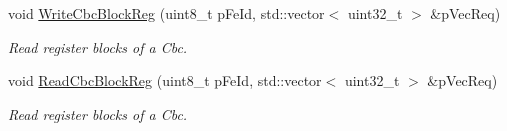 \begin{CompactItemize}
void \hyperlink{class_ph2___hw_interface_1_1_glib_f_w_interface_2bc165eebeab754425dcbffb21aa2717}{Write\-Cbc\-Block\-Reg} (uint8\_\-t p\-Fe\-Id, std::vector$<$ uint32\_\-t $>$ \&p\-Vec\-Req)
\begin{CompactList}\small\item\em Read register blocks of a Cbc. \item\end{CompactList}\item 
void \hyperlink{class_ph2___hw_interface_1_1_glib_f_w_interface_9dbc3cf2a991126aed53d834d4d152ce}{Read\-Cbc\-Block\-Reg} (uint8\_\-t p\-Fe\-Id, std::vector$<$ uint32\_\-t $>$ \&p\-Vec\-Req)
\begin{CompactList}\small\item\em Read register blocks of a Cbc. \item\end{CompactList}\end{CompactItemize}
